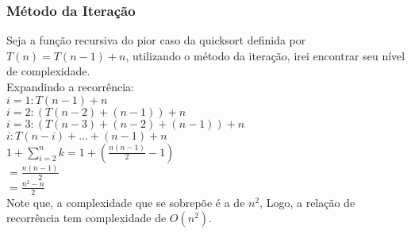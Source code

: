 \subsubsection{Método da Iteração}
Seja a função recursiva do pior caso da quicksort definida por $T(n) = T(n-1) + n$, utilizando o método da iteração, irei encontrar seu nível de complexidade. \\
Expandindo a recorrência: \\
$i = 1 : T(n - 1) + n$ \\
$i = 2 : (T(n - 2) + (n -1)) + n$ \\
$i = 3 : (T(n - 3) + (n - 2) + (n - 1)) + n$ \\
$i : T(n - i) + ... + (n - 1) + n$ \\
$1 + \sum_{i=2}^{n}k = 1 + (\frac{n(n-1)}{2} - 1)$ \\
$= \frac{n(n-1)}{2}$ \\
$= \frac{n^2 - n}{2}$ \\
Note que, a complexidade que se sobrepõe é a de $n^2$, Logo, a relação de recorrência tem complexidade de $O(n^2)$.